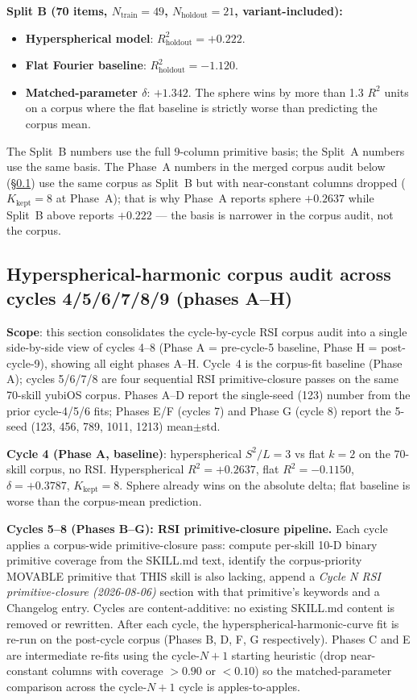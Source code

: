 \documentclass[11pt,a4paper]{article}
\begin{document}
\textbf{Split B (70 items, $N_{\mathrm{train}}=49$, $N_{\mathrm{holdout}}=21$, variant-included):}
\begin{itemize}
\item \textbf{Hyperspherical model}: $R^2_{\mathrm{holdout}} = +0.222$.
\item \textbf{Flat Fourier baseline}: $R^2_{\mathrm{holdout}} = -1.120$.
\item \textbf{Matched-parameter $\delta$}: $+1.342$. The sphere wins by more than 1.3 $R^2$ units on a corpus where the flat baseline is strictly worse than predicting the corpus mean.
\end{itemize}

The Split~B numbers use the full 9-column primitive basis; the Split~A numbers use the same basis. The Phase~A numbers in the merged corpus audit below (\S\ref{sec:audit}) use the same corpus as Split~B but with near-constant columns dropped ($K_\text{kept}=8$ at Phase~A); that is why Phase~A reports sphere $+0.2637$ while Split~B above reports $+0.222$ --- the basis is narrower in the corpus audit, not the corpus.

\subsection{Hyperspherical-harmonic corpus audit across cycles 4/5/6/7/8/9 (phases A--H)}\label{sec:audit}

\textbf{Scope}: this section consolidates the cycle-by-cycle RSI corpus audit into a single side-by-side view of cycles 4--8 (Phase A = pre-cycle-5 baseline, Phase H = post-cycle-9), showing all eight phases A--H. Cycle~4 is the corpus-fit baseline (Phase A); cycles 5/6/7/8 are four sequential RSI primitive-closure passes on the same 70-skill yubiOS corpus. Phases A--D report the single-seed (123) number from the prior cycle-4/5/6 fits; Phases E/F (cycles 7) and Phase G (cycle 8) report the 5-seed (123, 456, 789, 1011, 1213) mean$\pm$std.

\textbf{Cycle 4 (Phase A, baseline)}: hyperspherical $S^2/L=3$ vs flat $k=2$ on the 70-skill corpus, no RSI. Hyperspherical $R^2 = +0.2637$, flat $R^2 = -0.1150$, $\delta = +0.3787$, $K_\text{kept} = 8$. Sphere already wins on the absolute delta; flat baseline is worse than the corpus-mean prediction.

\textbf{Cycles 5--8 (Phases B--G): RSI primitive-closure pipeline.} Each cycle applies a corpus-wide primitive-closure pass: compute per-skill 10-D binary primitive coverage from the SKILL.md text, identify the corpus-priority MOVABLE primitive that THIS skill is also lacking, append a \emph{Cycle N RSI primitive-closure (2026-08-06)} section with that primitive's keywords and a Changelog entry. Cycles are content-additive: no existing SKILL.md content is removed or rewritten. After each cycle, the hyperspherical-harmonic-curve fit is re-run on the post-cycle corpus (Phases B, D, F, G respectively). Phases C and E are intermediate re-fits using the cycle-$N+1$ starting heuristic (drop near-constant columns with coverage $> 0.90$ or $< 0.10$) so the matched-parameter comparison across the cycle-$N+1$ cycle is apples-to-apples.
\end{document}
